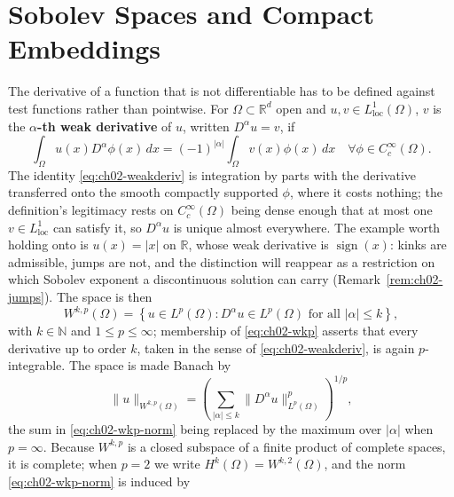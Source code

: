 \section{Sobolev Spaces and Compact Embeddings}

The derivative of a function that is not differentiable has to be defined against test functions rather than pointwise. For $\Omega \subset \mathbb{R}^d$ open and $u, v \in L^1_{\text{loc}}(\Omega)$, $v$ is the \textbf{$\alpha$-th weak derivative} of $u$, written $D^\alpha u = v$, if
\begin{equation}
  \int_\Omega u(x) D^\alpha \phi(x) \, dx = (-1)^{|\alpha|} \int_\Omega v(x) \phi(x) \, dx \quad \forall \phi \in C_c^\infty(\Omega).
  \label{eq:ch02-weakderiv}
\end{equation}
The identity \eqref{eq:ch02-weakderiv} is integration by parts with the derivative transferred onto the smooth compactly supported $\phi$, where it costs nothing; the definition's legitimacy rests on $C_c^\infty(\Omega)$ being dense enough that at most one $v \in L^1_{\mathrm{loc}}$ can satisfy it, so $D^\alpha u$ is unique almost everywhere. The example worth holding onto is $u(x) = |x|$ on $\mathbb{R}$, whose weak derivative is $\operatorname{sign}(x)$: kinks are admissible, jumps are not, and the distinction will reappear as a restriction on which Sobolev exponent a discontinuous solution can carry (Remark~\ref{rem:ch02-jumps}). The space is then
\begin{equation}
  W^{k,p}(\Omega) = \left\{ u \in L^p(\Omega) : D^\alpha u \in L^p(\Omega) \text{ for all } |\alpha| \le k \right\},
  \label{eq:ch02-wkp}
\end{equation}
with $k \in \mathbb{N}$ and $1 \le p \le \infty$; membership of \eqref{eq:ch02-wkp} asserts that every derivative up to order $k$, taken in the sense of \eqref{eq:ch02-weakderiv}, is again $p$-integrable. The space is made Banach by
\begin{equation}
  \|u\|_{W^{k,p}(\Omega)} = \left( \sum_{|\alpha| \le k} \|D^\alpha u\|_{L^p(\Omega)}^p \right)^{1/p},
  \label{eq:ch02-wkp-norm}
\end{equation}
the sum in \eqref{eq:ch02-wkp-norm} being replaced by the maximum over $|\alpha|$ when $p = \infty$. Because $W^{k,p}$ is a closed subspace of a finite product of complete spaces, it is complete; when $p = 2$ we write $H^k(\Omega) = W^{k,2}(\Omega)$, and the norm \eqref{eq:ch02-wkp-norm} is induced by
